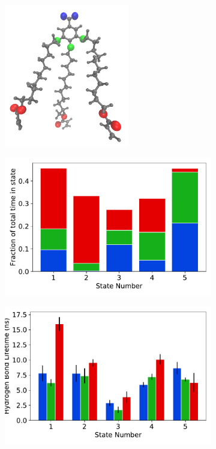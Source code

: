 \documentclass[journal=jpcbfk,manuscript=article]{achemso}
\begin{document}
  \begin{figure}
  \centering
  \begin{subfigure}{0.475\textwidth}
  \centering
  \includegraphics[width=0.6\textwidth, angle=0]{monomer_oxygens.png}
  \caption{}\label{fig:monomer_oxygens}
  \end{subfigure}
  \begin{subfigure}{0.475\textwidth}
  \includegraphics[width=\textwidth]{hbond_fractions.pdf}
  \caption{}\label{fig:hbond_fractions}
  \end{subfigure}
  \begin{subfigure}{0.475\textwidth}
  \includegraphics[width=\textwidth]{hbond_lifetimes.pdf}

\end{subfigure}
\end{figure}
\end{document}
